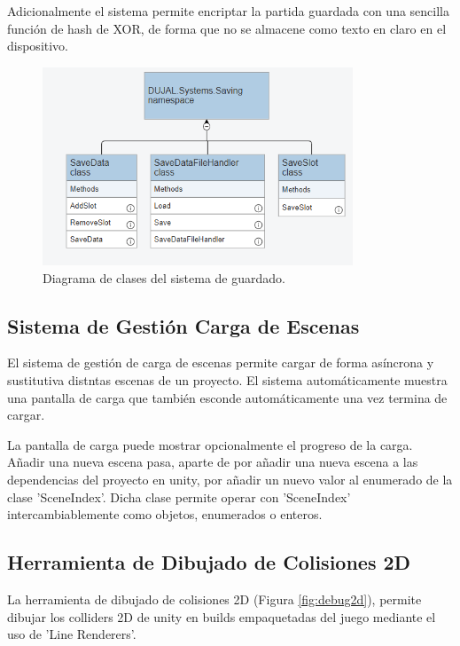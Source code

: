 Adicionalmente el sistema permite encriptar la partida guardada con una sencilla función de hash de XOR, de forma que no se almacene como texto en claro en el dispositivo.  

\begin{figure}[H]
  \centering
    \includegraphics[width=350px,clip=true]{Saving.png}
  \caption{Diagrama de clases del sistema de guardado.}
  \label{fig:savinguml}
\end{figure}

\subsection{Sistema de Gestión Carga de Escenas}
El sistema de gestión de carga de escenas permite cargar de forma asíncrona y sustitutiva distntas escenas de un proyecto. El sistema automáticamente muestra una 
pantalla de carga que también esconde automáticamente una vez termina de cargar. 

La pantalla de carga puede mostrar opcionalmente el progreso de la carga. Añadir una nueva escena pasa, aparte de por añadir una nueva escena a las dependencias del
 proyecto en unity, por añadir un nuevo valor al enumerado de la clase 'SceneIndex'. Dicha clase permite operar con 'SceneIndex' intercambiablemente como objetos, enumerados o enteros.

\subsection{Herramienta de Dibujado de Colisiones 2D}
La herramienta de dibujado de colisiones 2D (Figura \ref{fig:debug2d}), permite dibujar los colliders 2D de unity en builds empaquetadas del juego mediante el uso de
 'Line Renderers'. 

